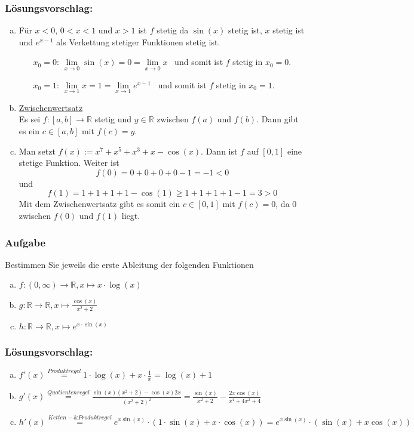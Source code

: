 \documentclass[a4paper,11pt]{scrartcl}
\newcounter{auf}
\newcommand{\Aufgabe}%
        {\addtocounter{auf}{1} \subsubsection*{\rmfamily  Aufgabe \theauf \hspace{1em}} }
\newcommand{\RR}{\mathbb{R}}
\begin{document}
\subsubsection*{Lösungsvorschlag:}
\begin{enumerate}[a)]
\item Für $x<0$, $0<x<1$ und $x>1$ ist $f$ stetig da $\sin(x)$ stetig ist, $x$ stetig ist und $e^{x-1}$ als Verkettung stetiger Funktionen stetig ist.
	\begin{itemize}
	\item[$x_0=0$:] $\lim \limits_{x\to 0} \sin(x)=0=\lim \limits_{x \to 0} x$ \ und somit ist $f$ stetig in $x_0=0$.
	\item[$x_0=1$:] $\lim \limits_{x\to 1} x=1=\lim \limits_{x \to 1} e^{x-1}$ \ und somit ist $f$ stetig in $x_0=1$.
	\end{itemize}
\item \underline{Zwischenwertsatz}\\ Es sei $f:[a,b] \to \RR$ stetig und $y \in \RR$ zwischen $f(a)$ und $f(b)$. Dann gibt es ein $c \in [a,b]$ mit $f(c)=y$.
\item Man setzt $f(x):=x^7+x^5+x^3+x-\cos(x)$. Dann ist $f$ auf $[0,1]$ eine stetige Funktion. Weiter ist 
$$f(0)=0+0+0+0-1=-1<0$$
und
$$f(1)=1+1+1+1-\cos(1)\ge 1+1+1+1-1=3>0$$
Mit dem Zwischenwertsatz gibt es somit ein $c\in[0,1]$ mit $f(c)=0$, da $0$ zwischen $f(0)$ und $f(1)$ liegt.

\end{enumerate}

\newpage
\Aufgabe
Bestimmen Sie jeweils die erste Ableitung der folgenden Funktionen

\begin{enumerate}[a)]
\item $f:(0,\infty) \to \RR, x \mapsto x \cdot \log(x) $
\item $g: \RR \to \RR, x \mapsto\frac{\cos(x)}{x^2+2}$
\item $h:\RR \to \RR, x \mapsto e^{x\cdot \sin(x)} $
\end{enumerate}

\subsubsection*{Lösungsvorschlag:}

\begin{enumerate}[a)]
\item $f'(x)\stackrel{Produktregel}{=}1\cdot \log(x)+x\cdot \frac{1}{x}=\log(x)+1$
\item $g'(x)\stackrel{Quotientenregel}{=}\frac{\sin(x)(x^2+2)-\cos(x)2x}{(x^2+2)^2}=\frac{\sin(x)}{x^2+2}-\frac{2x\cos(x)}{x^4+4x^2+4}$
\item $h'(x)\stackrel{Ketten- \& Produktregel}{=}e^{x\sin(x)}\cdot (1\cdot \sin(x)+x\cdot \cos(x))=e^{x\sin(x)}\cdot (\sin(x)+x\cos(x))$
\end{enumerate}
\end{document}
